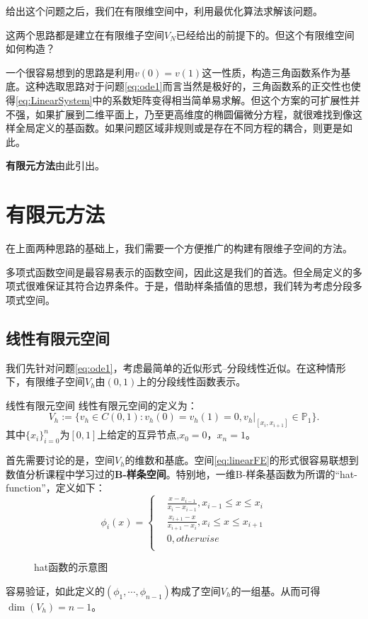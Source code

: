 \documentclass[lang=cn,10pt,newtx]{elegantbook}
\begin{document}
给出这个问题之后，我们在有限维空间中，利用最优化算法求解该问题。

这两个思路都是建立在有限维子空间$V_{N}$已经给出的前提下的。但这个有限维空间如何构造？

一个很容易想到的思路是利用$v(0)=v(1)$这一性质，构造三角函数系作为基底。这种选取思路对于问题\eqref{eq:ode1}而言当然是极好的，三角函数系的正交性也使得\eqref{eq:LinearSystem}中的系数矩阵变得相当简单易求解。但这个方案的可扩展性并不强，如果扩展到二维平面上，乃至更高维度的椭圆偏微分方程，就很难找到像这样全局定义的基函数。如果问题区域非规则或是存在不同方程的耦合，则更是如此。

\textbf{有限元方法}由此引出。
\section{有限元方法}
在上面两种思路的基础上，我们需要一个方便推广的构建有限维子空间的方法。

多项式函数空间是最容易表示的函数空间，因此这是我们的首选。但全局定义的多项式很难保证其符合边界条件。于是，借助样条插值的思想，我们转为考虑分段多项式空间。

\subsection{线性有限元空间}
我们先针对问题\eqref{eq:ode1}，考虑最简单的近似形式--分段线性近似。在这种情形下，有限维子空间$V_{h}$由$(0,1)$上的分段线性函数表示。
\begin{definition}{线性有限元空间}
  \label{LinearFE}
  线性有限元空间的定义为：
  \begin{equation}
    \label{eq:linearFE}
    V_{h}:=\{v_{h}\in C(0,1):v_{h}(0)=v_{h}(1)=0,v_{h}|_{[x_{i},x_{i+1}]}\in\mathbb{P}_{1}\}.
  \end{equation}
  其中$\{x_{i}\}_{i=0}^{n}$为$[0,1]$上给定的互异节点,$x_{0}=0$，$x_{n}=1$。
\end{definition}
首先需要讨论的是，空间$V_{h}$的维数和基底。空间\eqref{eq:linearFE}的形式很容易联想到数值分析课程中学习过的\textbf{B-样条空间}。特别地，一维B-样条基函数为所谓的“hat-function”，定义如下：
\begin{equation}
  \label{eq:hatfunc}
  \phi_{i}(x)=\left\{
    \begin{aligned}
      &\frac{x-x_{i-1}}{x_{i}-x_{i-1}},x_{i-1}\le x\le x_{i}\\
      &\frac{x_{i+1}-x}{x_{i+1}-x_{i}},x_{i}\le x\le x_{i+1}\\
      & 0,otherwise\\
    \end{aligned}
  \right.
\end{equation}
\begin{figure}[H]
  \centering
  \caption{hat函数的示意图}
\end{figure}
容易验证，如此定义的$(\phi_{1},\cdots,\phi_{n-1})$构成了空间$V_{h}$的一组基。从而可得$\dim(V_{h})=n-1$。
\end{document}
